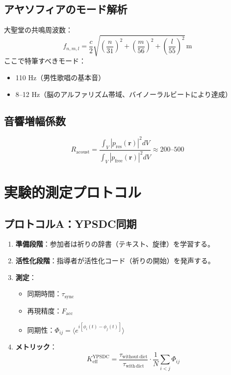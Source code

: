 \documentclass[12pt,a4paper]{article}
\begin{document}
	\subsection{アヤソフィアのモード解析}
	
	大聖堂の共鳴周波数：
	\[
	f_{n,m,l} = \frac{c}{2} \sqrt{\left(\frac{n}{31}\right)^2 + \left(\frac{m}{56}\right)^2 + \left(\frac{l}{55}\right)^2} \, \mathrm{m}
	\]
	ここで特筆すべきモード：
	\begin{itemize}
		\item 110 Hz（男性歌唱の基本音）
		\item 8–12 Hz（脳のアルファリズム帯域、バイノーラルビートにより達成）
	\end{itemize}
	
	\subsection{音響増幅係数}
	\[
	R_{\mathrm{acoust}} = \frac{\int_V |p_{\mathrm{res}}(\mathbf{r})|^2 dV}{\int_V |p_{\mathrm{free}}(\mathbf{r})|^2 dV} \approx 200\text{--}500
	\]
	
	\section{実験的測定プロトコル}
	
	\subsection{プロトコルA：YPSDC同期}
	
	\begin{enumerate}
		\item \textbf{準備段階}：参加者は祈りの辞書（テキスト、旋律）を学習する。
		\item \textbf{活性化段階}：指導者が活性化コード（祈りの開始）を発声する。
		\item \textbf{測定}：
		\begin{itemize}
			\item 同期時間：$\tau_{\mathrm{sync}}$
			\item 再現精度：$F_{\mathrm{acc}}$
			\item 同期性：$\Phi_{ij} = \langle e^{i[\phi_i(t) - \phi_j(t)]} \rangle$
		\end{itemize}
		\item \textbf{メトリック}：
		\[
		K_{\mathrm{eff}}^{\mathrm{YPSDC}} = \frac{\tau_{\mathrm{without\,dict}}}{\tau_{\mathrm{with\,dict}}} \cdot \frac{1}{N} \sum_{i<j} \Phi_{ij}
		\]
	\end{enumerate}
	
\end{document}
